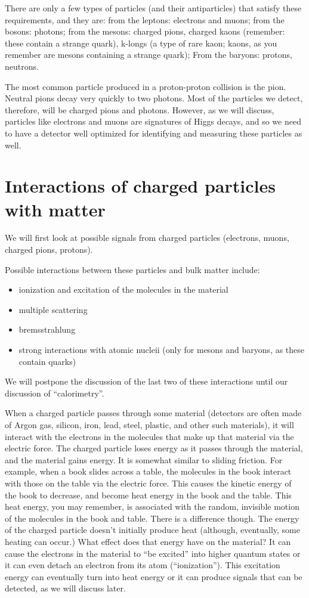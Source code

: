 There are only a few types of particles (and their antiparticles) that satisfy these requirements, and they are: from the leptons: electrons and muons; from the bosons: photons; from the mesons:
charged pions, charged kaons (remember: these contain a strange quark), k-longs (a type of rare kaon; kaons, as you remember are mesons containing a strange quark); From the baryons: protons, neutrons.

The most common particle produced in a proton-proton collision is the pion.  Neutral pions decay very quickly to two photons. Most of the particles we detect, therefore, will be charged pions and photons.  However, as we will discuss, particles like electrons and muons are signatures of Higgs decays, and so we need to have a detector well optimized for identifying and measuring these particles as well.




\section{Interactions of charged particles with matter}
We will first look at possible signals from charged particles (electrons, muons, charged pions, protons).

Possible interactions between these particles and bulk matter include:
\begin{itemize}
\item ionization and excitation of the molecules in the material
\item multiple scattering
\item bremsstrahlung
\item strong interactions with atomic nucleii (only for mesons and baryons, as these contain quarks)
\end{itemize}
We will postpone the discussion of the last two of these interactions until our discussion of ``calorimetry''.

When a charged particle passes through some material (detectors are often made of Argon gas, silicon, iron, lead, steel, plastic, and other such materials), it will interact with the electrons in the molecules that make up that material via the electric force.  
The charged particle loses energy as it passes through the material, and the material gains energy.  
It is somewhat similar to sliding friction. For example, when a book slides across a table, the molecules in the book interact with those on the table via the electric force.  This causes the kinetic energy of the book to decrease, and become heat energy in the book and the table.  This heat energy, you may remember, is associated with the random, invisible motion of the molecules in the book and table.  There is a difference though.  The energy of the charged particle doesn't initially produce heat (although, eventually, some heating can occur.)
What effect does that energy have on the material?  It can cause the electrons in the material to ``be excited'' into higher quantum states or it can even detach an electron from its atom (``ionization'').  This excitation energy can eventually turn into heat energy or it can produce signals that can be detected, as we will discuss later.

